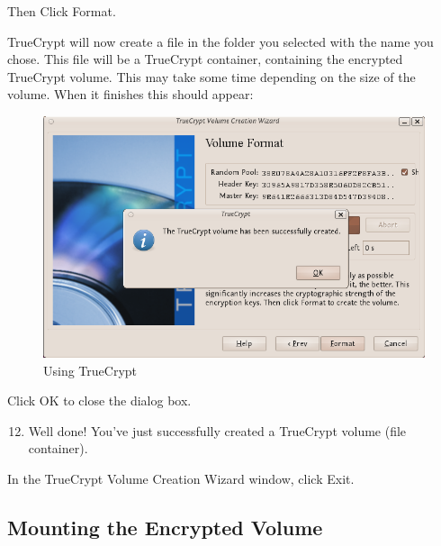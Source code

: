Then Click Format.

TrueCrypt will now create a file in the folder you selected with the
name you chose. This file will be a TrueCrypt container, containing the
encrypted TrueCrypt volume. This may take some time depending on the
size of the volume. When it finishes this should appear:

\begin{figure}[htbp]
\centering
\includegraphics{using_tc_011.png}
\caption{Using TrueCrypt}
\end{figure}

Click OK to close the dialog box.

\begin{enumerate}[1.]
\setcounter{enumi}{11}
\item
  Well done! You've just successfully created a TrueCrypt volume (file
  container).
\end{enumerate}
In the TrueCrypt Volume Creation Wizard window, click Exit.

\subsection{Mounting the Encrypted Volume}

